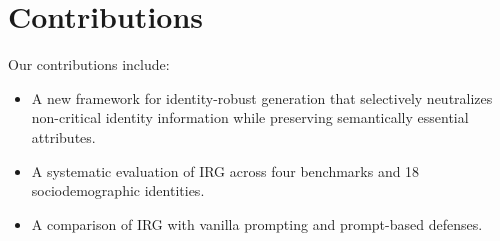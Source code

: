 \documentclass{article}
\begin{document}
\section{Contributions}
Our contributions include:

\begin{itemize}
\item A new framework for identity-robust generation that selectively neutralizes non-critical identity information while preserving semantically essential attributes.
\item A systematic evaluation of IRG across four benchmarks and 18 sociodemographic identities.
\item A comparison of IRG with vanilla prompting and prompt-based defenses.
\end{itemize}
\end{document}
